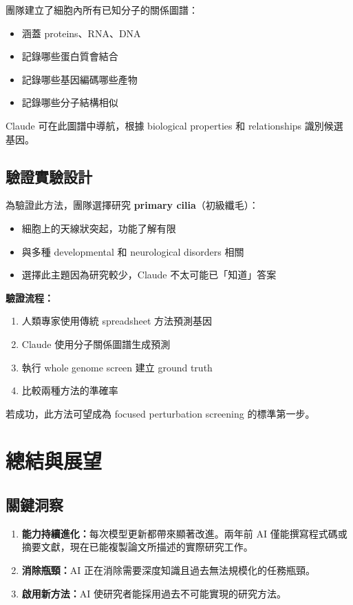 \documentclass[12pt,a4paper]{article}
\begin{document}
團隊建立了細胞內所有已知分子的關係圖譜：
\begin{itemize}
    \item 涵蓋 proteins、RNA、DNA
    \item 記錄哪些蛋白質會結合
    \item 記錄哪些基因編碼哪些產物
    \item 記錄哪些分子結構相似
\end{itemize}

Claude 可在此圖譜中導航，根據 biological properties 和 relationships 識別候選基因。

\subsection{驗證實驗設計}

為驗證此方法，團隊選擇研究 \textbf{primary cilia}（初級纖毛）：

\begin{itemize}
    \item 細胞上的天線狀突起，功能了解有限
    \item 與多種 developmental 和 neurological disorders 相關
    \item 選擇此主題因為研究較少，Claude 不太可能已「知道」答案
\end{itemize}

\textbf{驗證流程：}
\begin{enumerate}
    \item 人類專家使用傳統 spreadsheet 方法預測基因
    \item Claude 使用分子關係圖譜生成預測
    \item 執行 whole genome screen 建立 ground truth
    \item 比較兩種方法的準確率
\end{enumerate}

若成功，此方法可望成為 focused perturbation screening 的標準第一步。

\section{總結與展望}

\subsection{關鍵洞察}

\begin{enumerate}
    \item \textcolor{emergency_red}{\textbf{能力持續進化：}}每次模型更新都帶來顯著改進。兩年前 AI 僅能撰寫程式碼或摘要文獻，現在已能複製論文所描述的實際研究工作。

    \item \textcolor{emergency_red}{\textbf{消除瓶頸：}}AI 正在消除需要深度知識且過去無法規模化的任務瓶頸。

    \item \textcolor{emergency_red}{\textbf{啟用新方法：}}AI 使研究者能採用過去不可能實現的研究方法。
\end{enumerate}
\end{document}
